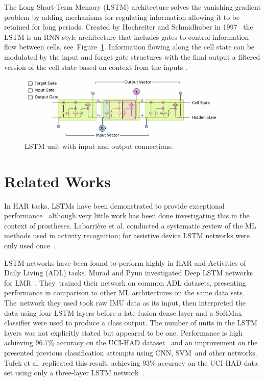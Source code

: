 The Long Short-Term Memory (LSTM) architecture solves the vanishing gradient problem by adding mechanisms for regulating information allowing it to be retained for long periods. Created by Hochreiter and Schmidhuber in 1997~\cite{Hochreiter1997} the LSTM is an RNN style architecture that includes gates to control information flow between cells, see~\mbox{Figure~\ref{fig:lstm_unit}.} Information flowing along the cell state can be modulated by the input and forget gate structures with the final output a filtered version of the cell state based on context from the inputs \cite{Olah2015}.

\begin{figure}[!hbt]
    \centering
    \includegraphics[width=0.9\textwidth]{content/4-LSTM_Behaviour/lstm/lstm_internal_operation.jpg}
    \caption{LSTM unit with input and output connections.}
    \label{fig:lstm_unit}
\end{figure}

\section{Related Works}
\label{sec:related_work}
In HAR tasks, LSTMs have been demonstrated to provide exceptional performance~\cite{Murad2017} although very little work has been done investigating this in the context of prostheses. Labarri\`ere et al. conducted a systematic review of the ML methods used in activity recognition; for assistive device LSTM networks were only used once~\cite{Labarriere2020}.

LSTM networks have been found to perform highly in HAR and Activities of Daily Living (ADL) tasks. Murad and Pyun investigated Deep LSTM networks for LMR~\cite{Murad2017}. They~trained their network on common ADL datasets, presenting performance in comparison to other ML architectures on the same data sets. The~network they used took raw IMU data as its input, then interpreted the data using four LSTM layers before a late fusion dense layer and a SoftMax classifier were used to produce a class output. The number of units in the LSTM layers was not explicitly stated but appeared to be one. Performance is high achieving 96.7\% accuracy on the UCI-HAD dataset~\cite{Anguita2013} and an improvement on the presented previous classification attempts using CNN, SVM~and other networks. Tufek et al. replicated this result, achieving 93\% accuracy on the UCI-HAD data set using only a three-layer LSTM network~\cite{Tufek2020}.

